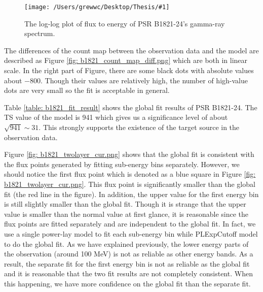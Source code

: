 \documentclass[12pt]{report}
\newcommand{\singleFig}[3]{
  \begin{figure}[!ht]
    \centering
    \texttt{[image: /Users/grewwc/Desktop/Thesis/\#1]}
    \caption{#3}
    \label{fig: #1}
  \end{figure}
}
\begin{document}
            \singleFig{b1821_cur.png}{0.40}{The log-log plot of flux to energy of 
              PSR B1821-24's gamma-ray spectrum.}
              \vspace{1cm}

            The differences of the count map between the observation data and the model are described as Figure 
            \ref{fig: b1821_count_map_diff.png} which are both in linear scale. In the right part of Figure, 
            there are some black dots 
            with absolute values about $-800$. Though their values are relatively high, the number of 
            high-value dots are very small so the fit is acceptable in general. 

            Table \ref{table: b1821_fit_result} shows the global fit results of PSR B1821-24. 
            The TS value of the model is 941 which gives us a significance level 
            of about $\sqrt{941} \sim 31$. This strongly supports the existence of the target source in 
            the observation data.

            Figure \ref{fig: b1821_twolayer_cur.png} shows that the global fit is consistent with 
            the flux points generated by fitting sub-energy bins separately. However, 
            we should notice the first flux point 
            which is denoted as a blue square in Figure \ref{fig: b1821_twolayer_cur.png}. This 
            flux point is significantly smaller than the global fit (the red line in the figure). 
            In addition, the upper value for the first energy bin is still slightly smaller than the global fit. 
            Though it is strange that the upper value is smaller than the normal value at first glance, 
            it is reasonable since the flux points are fitted separately and are independent to 
            the global fit. In fact, we use a single power-lay model to fit each sub-energy bin while PLExpCutoff
            model to do the global fit. As we have explained previously, the lower energy parts of the 
            observation (around 100 MeV) is not as reliable as other energy bands. As a result, the separate 
            fit for the first energy bin
            is not as reliable as the global fit and it is reasonable that the two fit results are not completely
            consistent. When this happening, we have more confidence on the global fit than the separate fit.
            
\end{document}
